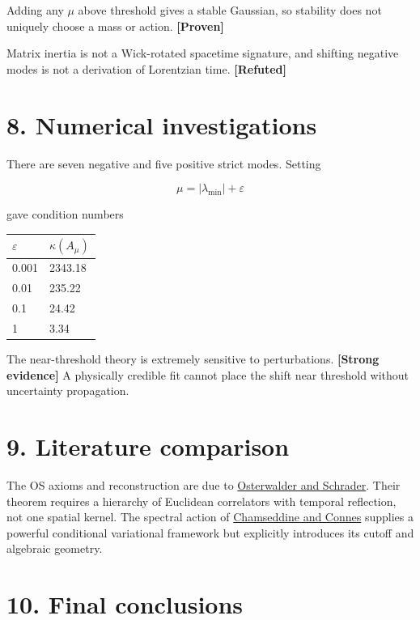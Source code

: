 \documentclass[11pt,a4paper,openany]{report}
\newcommand{\statusProven}{\textcolor{fingreen}{[Proven]}}
\newcommand{\statusStrong}{\textcolor{finblue}{[Strong evidence]}}
\newcommand{\statusRefuted}{\textcolor{finred}{[Refuted]}}
\begin{document}
Adding any \(\mu\) above threshold gives a stable Gaussian, so stability does not uniquely choose a mass or action. \textbf{\statusProven{}}

Matrix inertia is not a Wick-rotated spacetime signature, and shifting negative modes is not a derivation of Lorentzian time. \textbf{\statusRefuted{}}

\section{8. Numerical investigations}

There are seven negative and five positive strict modes. Setting

\[
\mu=|\lambda_{\min}|+\varepsilon
\]

gave condition numbers

\begin{center}
\begingroup\small
\setlength{\tabcolsep}{3.5pt}
\renewcommand{\arraystretch}{1.16}
\begin{longtable}{@{}p{}p{}@{}}
\toprule
\textbf{\(\varepsilon\)} & \textbf{\(\kappa(A_\mu)\)} \\
\midrule
\endhead
0.001 & 2343.18 \\
0.01 & 235.22 \\
0.1 & 24.42 \\
1 & 3.34 \\
\bottomrule
\end{longtable}
\endgroup
\end{center}

The near-threshold theory is extremely sensitive to perturbations. \textbf{\statusStrong{}} A physically credible fit cannot place the shift near threshold without uncertainty propagation.

\section{9. Literature comparison}

The OS axioms and reconstruction are due to \href{https://doi.org/10.1007/BF01645738}{Osterwalder and Schrader}. Their theorem requires a hierarchy of Euclidean correlators with temporal reflection, not one spatial kernel. The spectral action of \href{https://arxiv.org/abs/hep-th/9606001}{Chamseddine and Connes} supplies a powerful conditional variational framework but explicitly introduces its cutoff and algebraic geometry.

\section{10. Final conclusions}
\end{document}
